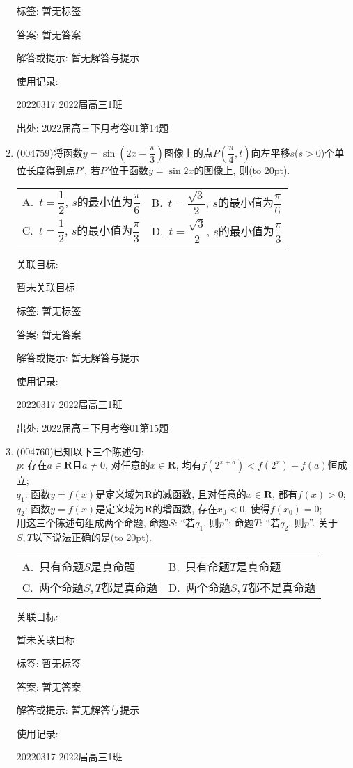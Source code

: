 \documentclass[10pt,a4paper]{article}
\newcommand{\bracket}[1]{(\hbox to #1pt{})}
\newcommand{\twoch}[4]{\par\begin{tabular}{p{.46\textwidth}p{.46\textwidth}}
A.~#1& B.~#2\\
C.~#3& D.~#4
\end{tabular}}
\begin{document}
\begin{enumerate}[1.]
标签: 暂无标签

答案: 暂无答案

解答或提示: 暂无解答与提示

使用记录:

20220317	2022届高三1班	


出处: 2022届高三下月考卷01第14题
\item { (004759)}将函数$y=\sin (2x-\dfrac{\pi}3)$图像上的点$P(\dfrac{\pi}4,t)$向左平移$s$($s>0$)个单位长度得到点$P'$, 若$P'$位于函数$y=\sin 2x$的图像上, 则\bracket{20}.
\twoch{$t=\dfrac 12$, $s$的最小值为$\dfrac{\pi}6$}{$t=\dfrac{\sqrt 3}2$, $s$的最小值为$\dfrac{\pi}6$}{$t=\dfrac 12$, $s$的最小值为$\dfrac{\pi}3$}{$t=\dfrac{\sqrt 3}2$, $s$的最小值为$\dfrac{\pi}3$}


关联目标:

暂未关联目标



标签: 暂无标签

答案: 暂无答案

解答或提示: 暂无解答与提示

使用记录:

20220317	2022届高三1班	


出处: 2022届高三下月考卷01第15题
\item { (004760)}已知以下三个陈述句:\\
$p$: 存在$a\in \mathbf{R}$且$a\ne 0$, 对任意的$x\in \mathbf{R}$, 均有$f(2^{x+a})<f(2^x)+f(a)$恒成立;\\
$q_1$: 函数$y=f(x)$是定义域为$\mathbf{R}$的减函数, 且对任意的$x\in \mathbf{R}$, 都有$f(x)>0$;\\
$q_2$: 函数$y=f(x)$是定义域为$\mathbf{R}$的增函数, 存在$x_0<0$, 使得$f(x_0)=0$;\\
用这三个陈述句组成两个命题, 命题$S$: ``若$q_1$, 则$p$''; 命题$T$: ``若$q_2$, 则$p$''. 关于$S,T$以下说法正确的是\bracket{20}.
\twoch{只有命题$S$是真命题}{只有命题$T$是真命题}{两个命题$S,T$都是真命题}{两个命题$S,T$都不是真命题}


关联目标:

暂未关联目标



标签: 暂无标签

答案: 暂无答案

解答或提示: 暂无解答与提示

使用记录:

20220317	2022届高三1班	



\end{enumerate}
\end{document}
